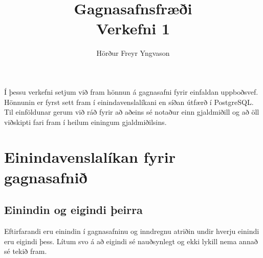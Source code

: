 \documentclass[a4paper,icelandic]{article}
\title{\textbf{Gagnasafnsfræði}\\Verkefni 1}
\author{Hörður Freyr Yngvason}
\date{}
\theoremstyle{definition} \newtheorem{skilgr}{Skilgreining}
\theoremstyle{plain}      \newtheorem{setn}{Setning}
\theoremstyle{remark}     \newtheorem*{lausn}{Lausn}
\begin{document}
\maketitle

Í þessu verkefni setjum við fram hönnun á gagnasafni fyrir einfaldan uppboðsvef.
Hönnunin er fyrst sett fram í einindavenslalíkani en síðan útfærð í PostgreSQL.
Til einföldunar gerum við ráð fyrir að aðeins sé notaður einn gjaldmiðill og að
öll viðskipti fari fram í heilum einingum gjaldmiðilsins.

\section{Einindavenslalíkan fyrir gagnasafnið}

\subsection{Einindin og eigindi þeirra}

Eftirfarandi eru einindin í gagnasafninu og inndregnu atriðin undir hverju
einindi eru eigindi þess. Lítum svo á að eigindi sé nauðsynlegt og ekki lykill
nema annað sé tekið fram.
\end{document}
